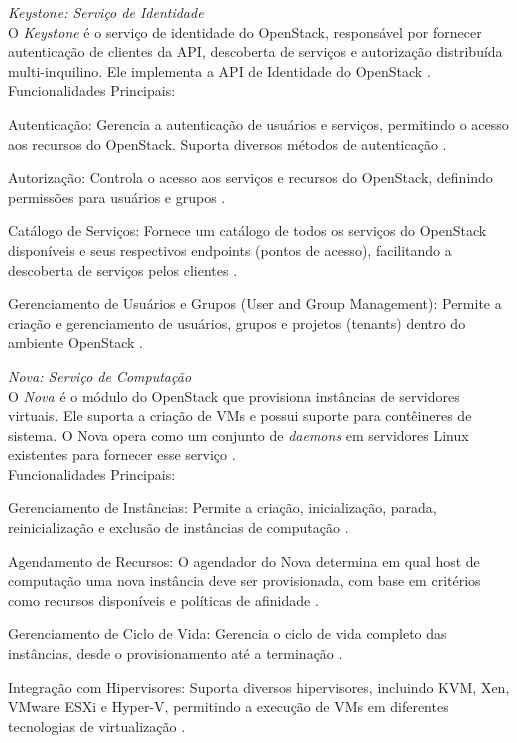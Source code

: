 \begin{description}
    \item \emph{Keystone: Serviço de Identidade}\\
    O \textit{Keystone} é o serviço de identidade do OpenStack, responsável por fornecer autenticação de clientes da API, descoberta de serviços e autorização distribuída multi-inquilino. Ele implementa a API de Identidade do OpenStack \cite{openstackkeystone}.\\
    Funcionalidades Principais:
    \begin{description}
        \item Autenticação: Gerencia a autenticação de usuários e serviços, permitindo o acesso aos recursos do OpenStack. Suporta diversos métodos de autenticação \cite{openstackkeystone}.
        \item Autorização: Controla o acesso aos serviços e recursos do OpenStack, definindo permissões para usuários e grupos \cite{openstackkeystone}.
        \item Catálogo de Serviços: Fornece um catálogo de todos os serviços do OpenStack disponíveis e seus respectivos endpoints (pontos de acesso), facilitando a descoberta de serviços pelos clientes \cite{openstackkeystone}.
        \item Gerenciamento de Usuários e Grupos (User and Group Management): Permite a criação e gerenciamento de usuários, grupos e projetos (tenants) dentro do ambiente OpenStack \cite{openstackkeystone}.
    \end{description}

    \item \emph{Nova: Serviço de Computação}\\
    O \textit{Nova} é o módulo do OpenStack que provisiona instâncias de servidores virtuais. Ele suporta a criação de VMs e possui suporte para contêineres de sistema. O Nova opera como um conjunto de \textit{daemons} em servidores Linux existentes para fornecer esse serviço \cite{openstacknova}.\\
    Funcionalidades Principais:
    \begin{description}
        \item Gerenciamento de Instâncias: Permite a criação, inicialização, parada, reinicialização e exclusão de instâncias de computação \cite{openstacknova}.
        \item Agendamento de Recursos: O agendador do Nova determina em qual host de computação uma nova instância deve ser provisionada, com base em critérios como recursos disponíveis e políticas de afinidade \cite{openstacknova}.
        \item Gerenciamento de Ciclo de Vida: Gerencia o ciclo de vida completo das instâncias, desde o provisionamento até a terminação \cite{openstacknova}.
        \item Integração com Hipervisores: Suporta diversos hipervisores, incluindo KVM, Xen, VMware ESXi e Hyper-V, permitindo a execução de VMs em diferentes tecnologias de virtualização \cite{openstacknova}.
    \end{description}


\end{description}
